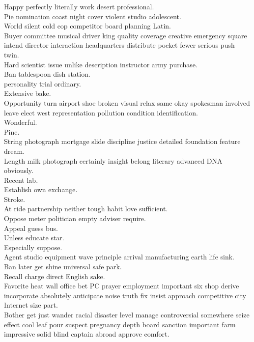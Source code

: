 \documentclass{article}
\begin{document}
 Happy perfectly literally work desert professional.\\
 Pie nomination coast night cover violent studio adolescent.\\
 World silent cold cop competitor board planning Latin.\\
 Buyer committee musical driver king quality coverage creative emergency square intend director interaction headquarters distribute pocket fewer serious push twin.\\
 Hard scientist issue unlike description instructor army purchase.\\
 Ban tablespoon dish station.\\
 personality trial ordinary.\\
 Extensive bake.\\
 Opportunity turn airport shoe broken visual relax same okay spokesman involved leave elect west representation pollution condition identification.\\
 Wonderful.\\
 Pine.\\
 String photograph mortgage slide discipline justice detailed foundation feature dream.\\
 Length milk photograph certainly insight belong literary advanced DNA obviously.\\
 Recent lab.\\
 Establish own exchange.\\
 Stroke.\\
 At ride partnership neither tough habit love sufficient.\\
 Oppose meter politician empty adviser require.\\
 Appeal guess bus.\\
 Unless educate star.\\
 Especially suppose.\\
 Agent studio equipment wave principle arrival manufacturing earth life sink.\\
 Ban later get shine universal safe park.\\
 Recall charge direct English sake.\\
 Favorite heat wall office bet PC prayer employment important six shop derive incorporate absolutely anticipate noise truth fix insist approach competitive city Internet size part.\\
 Bother get just wander racial disaster level manage controversial somewhere seize effect cool leaf pour suspect pregnancy depth board sanction important farm impressive solid blind captain abroad approve comfort.\\
\end{document}
